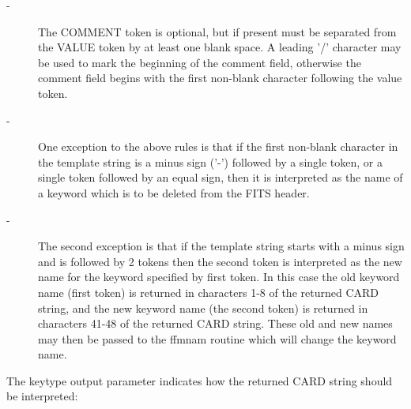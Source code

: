 \begin{description}
\item[- ]     The COMMENT token is optional, but if present must be separated from
        the VALUE token by at least one blank space.  A leading '/' character
        may be used to mark the beginning of the comment field, otherwise the
        comment field begins with the first non-blank character following the
       value token.
\end{description}


\begin{description}
\item[- ]     One exception to the above rules is that if the first non-blank
        character in the template string is a minus sign ('-') followed
        by a single token, or a single token followed by an equal sign,
        then it is interpreted as the name of a keyword which is to be
       deleted from the FITS header.
\end{description}


\begin{description}
\item[- ]     The second exception is that if the template string starts with
        a minus sign and is followed by 2 tokens then the second token
        is interpreted as the new name for the keyword specified by
        first token.  In this case the old keyword name (first token)
        is returned in characters 1-8 of the returned CARD string, and
        the new keyword name (the second token) is returned in characters
        41-48 of the returned CARD string.  These old and new names
        may then be passed to the ffmnam routine which will change
       the keyword name.
\end{description}

    The keytype output parameter indicates how the returned CARD string
    should be interpreted:


